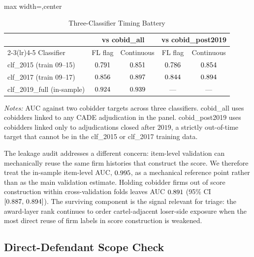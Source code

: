 \begin{table}[htbp]
\centering
\caption{Three-Classifier Timing Battery}
\label{tab:three_classifier_submission}
\footnotesize
\begin{adjustbox}{max width=\textwidth,center}
\begin{threeparttable}
\begin{tabular}{p{4.0cm}cccc}
\toprule
& \multicolumn{2}{c}{vs cobid\_all} & \multicolumn{2}{c}{vs cobid\_post2019} \\
\cmidrule(lr){2-3}\cmidrule(lr){4-5}
Classifier & FL flag & Continuous & FL flag & Continuous \\
\midrule
clf\_2015 (train 09--15) & $0.791$ & $0.851$
  & $0.786$ & $0.854$ \\
clf\_2017 (train 09--17) & $0.856$ & $0.897$
  & $0.844$ & $0.894$ \\
clf\_2019\_full (in-sample) & $0.924$ & $0.939$
  & --- & --- \\
\bottomrule
\end{tabular}
\begin{tablenotes}
\footnotesize
\item \textit{Notes:} AUC against two cobidder targets across three
classifiers. cobid\_all uses cobidders linked to any CADE adjudication
in the panel. cobid\_post2019 uses cobidders linked only to
adjudications closed after $2019$, a strictly out-of-time target
that cannot be in the clf\_2015 or clf\_2017 training data.
\end{tablenotes}
\end{threeparttable}
\end{adjustbox}
\end{table}

The leakage audit addresses a different concern: item-level
validation can mechanically reuse the same firm histories that
construct the score. We therefore treat the in-sample item-level
AUC, $0.995$, as a mechanical reference point rather
than as the main validation estimate. Holding cobidder firms out
of score construction within cross-validation folds leaves AUC
$0.891$ (95\% CI $[0.887,\,0.894]$). The surviving
component is the signal relevant for triage: the award-layer
rank continues to order cartel-adjacent loser-side exposure when
the most direct reuse of firm labels in score construction is
weakened.

\subsection{Direct-Defendant Scope Check}
\label{sec:validation_direct}

